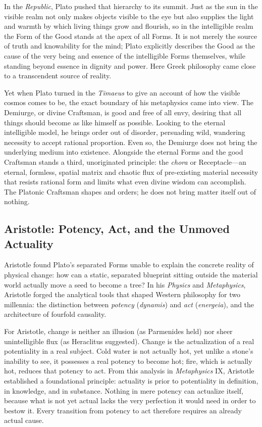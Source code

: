 In the \emph{Republic}, Plato pushed that hierarchy to its summit. Just as the sun in the visible realm not only makes objects visible to the eye but also supplies the light and warmth by which living things grow and flourish, so in the intelligible realm the Form of the Good stands at the apex of all Forms. It is not merely the source of truth and knowability for the mind; Plato explicitly describes the Good as the cause of the very being and essence of the intelligible Forms themselves, while standing beyond essence in dignity and power. Here Greek philosophy came close to a transcendent source of reality.

Yet when Plato turned in the \emph{Timaeus} to give an account of how the visible cosmos comes to be, the exact boundary of his metaphysics came into view. The Demiurge, or divine Craftsman, is good and free of all envy, desiring that all things should become as like himself as possible. Looking to the eternal intelligible model, he brings order out of disorder, persuading wild, wandering necessity to accept rational proportion. Even so, the Demiurge does not bring the underlying medium into existence. Alongside the eternal Forms and the good Craftsman stands a third, unoriginated principle: the \emph{chora} or Receptacle---an eternal, formless, spatial matrix and chaotic flux of pre-existing material necessity that resists rational form and limits what even divine wisdom can accomplish. The Platonic Craftsman shapes and orders; he does not bring matter itself out of nothing.

\subsection{Aristotle: Potency, Act, and the Unmoved Actuality}

Aristotle found Plato's separated Forms unable to explain the concrete reality of physical change: how can a static, separated blueprint sitting outside the material world actually move a seed to become a tree? In his \emph{Physics} and \emph{Metaphysics}, Aristotle forged the analytical tools that shaped Western philosophy for two millennia: the distinction between \emph{potency} (\emph{dynamis}) and \emph{act} (\emph{energeia}), and the architecture of fourfold causality.

For Aristotle, change is neither an illusion (as Parmenides held) nor sheer unintelligible flux (as Heraclitus suggested). Change is the actualization of a real potentiality in a real subject. Cold water is not actually hot, yet unlike a stone's inability to see, it possesses a real potency to become hot; fire, which is actually hot, reduces that potency to act. From this analysis in \emph{Metaphysics} IX, Aristotle established a foundational principle: actuality is prior to potentiality in definition, in knowledge, and in substance. Nothing in mere potency can actualize itself, because what is not yet actual lacks the very perfection it would need in order to bestow it. Every transition from potency to act therefore requires an already actual cause.

